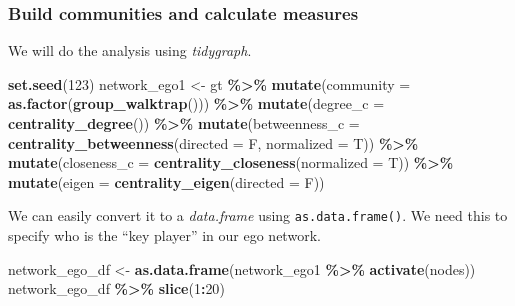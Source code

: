 \documentclass[
]{article}
\newenvironment{Shaded}{\begin{snugshade}}{\end{snugshade}}
\newcommand{\AttributeTok}[1]{\textcolor[rgb]{0.13,0.29,0.53}{#1}}
\newcommand{\DecValTok}[1]{\textcolor[rgb]{0.00,0.00,0.81}{#1}}
\newcommand{\FunctionTok}[1]{\textcolor[rgb]{0.13,0.29,0.53}{\textbf{#1}}}
\newcommand{\NormalTok}[1]{#1}
\newcommand{\OtherTok}[1]{\textcolor[rgb]{0.56,0.35,0.01}{#1}}
\newcommand{\SpecialCharTok}[1]{\textcolor[rgb]{0.81,0.36,0.00}{\textbf{#1}}}
\begin{document}
\hypertarget{build-communities-and-calculate-measures}{%
\subsubsection{Build communities and calculate measures}\label{build-communities-and-calculate-measures}}

We will do the analysis using \emph{tidygraph}.

\footnotesize

\begin{Shaded}
\begin{Highlighting}[]
\FunctionTok{set.seed}\NormalTok{(}\DecValTok{123}\NormalTok{)}
\NormalTok{network\_ego1 }\OtherTok{\textless{}{-}}\NormalTok{ gt }\SpecialCharTok{\%\textgreater{}\%} 
  \FunctionTok{mutate}\NormalTok{(}\AttributeTok{community =} \FunctionTok{as.factor}\NormalTok{(}\FunctionTok{group\_walktrap}\NormalTok{())) }\SpecialCharTok{\%\textgreater{}\%}
  \FunctionTok{mutate}\NormalTok{(}\AttributeTok{degree\_c =} \FunctionTok{centrality\_degree}\NormalTok{()) }\SpecialCharTok{\%\textgreater{}\%}
  \FunctionTok{mutate}\NormalTok{(}\AttributeTok{betweenness\_c =} \FunctionTok{centrality\_betweenness}\NormalTok{(}\AttributeTok{directed =}\NormalTok{ F, }\AttributeTok{normalized =}\NormalTok{ T)) }\SpecialCharTok{\%\textgreater{}\%}
  \FunctionTok{mutate}\NormalTok{(}\AttributeTok{closeness\_c =} \FunctionTok{centrality\_closeness}\NormalTok{(}\AttributeTok{normalized =}\NormalTok{ T)) }\SpecialCharTok{\%\textgreater{}\%}
  \FunctionTok{mutate}\NormalTok{(}\AttributeTok{eigen =} \FunctionTok{centrality\_eigen}\NormalTok{(}\AttributeTok{directed =}\NormalTok{ F))}
\end{Highlighting}
\end{Shaded}

\normalsize

We can easily convert it to a \emph{data.frame} using \texttt{as.data.frame()}. We need this to specify who is the ``key player'' in our ego network.

\footnotesize

\begin{Shaded}
\begin{Highlighting}[]
\NormalTok{network\_ego\_df }\OtherTok{\textless{}{-}} \FunctionTok{as.data.frame}\NormalTok{(network\_ego1 }\SpecialCharTok{\%\textgreater{}\%} \FunctionTok{activate}\NormalTok{(nodes))}
\NormalTok{network\_ego\_df }\SpecialCharTok{\%\textgreater{}\%} \FunctionTok{slice}\NormalTok{(}\DecValTok{1}\SpecialCharTok{:}\DecValTok{20}\NormalTok{)}
\end{Highlighting}
\end{Shaded}
\end{document}
